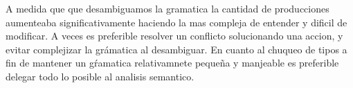 A medida que que desambiguamos la gramatica la cantidad de producciones aumenteaba significativamente haciendo la mas compleja de entender y dificil de modificar. A veces es preferible resolver un conflicto solucionando una accion, y evitar complejizar la grámatica al desambiguar. En cuanto al chuqueo de tipos a fin de mantener un gŕamatica relativamnete pequeña y manjeable es preferible delegar todo lo posible al analisis semantico. 
     
